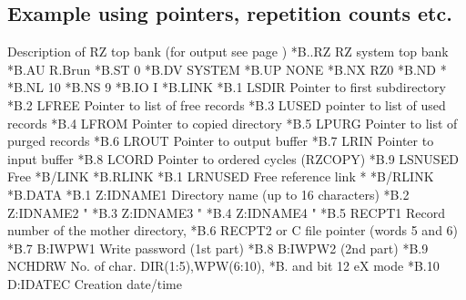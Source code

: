 \subsection{Example using pointers, repetition counts etc.}
\begin{XMPt}{Description of RZ top bank (for output see page \pageref{xmp:rztop})}
*B..RZ  RZ system top bank
*B.AU   R.Brun
*B.ST   0
*B.DV   SYSTEM
*B.UP   NONE
*B.NX   RZ0
*B.ND   *
*B.NL   10
*B.NS   9
*B.IO   I
*B.LINK
*B.1    LSDIR      Pointer to first subdirectory
*B.2    LFREE      Pointer to list of free records
*B.3    LUSED      pointer to list of used records
*B.4    LFROM      Pointer to copied directory
*B.5    LPURG      Pointer to list of purged records
*B.6    LROUT      Pointer to output buffer
*B.7    LRIN       Pointer to input buffer
*B.8    LCORD      Pointer to ordered cycles (RZCOPY)
*B.9    LSNUSED    Free 
*B/LINK
*B.RLINK
*B.1    LRNUSED    Free reference link                     *
*B/RLINK
*B.DATA
*B.1     Z:IDNAME1     Directory name  (up to 16 characters)    
*B.2     Z:IDNAME2                 "                              
*B.3     Z:IDNAME3                 "                              
*B.4     Z:IDNAME4                 "                              
*B.5     RECPT1        Record number of the mother directory,   
*B.6     RECPT2        or C file pointer (words 5 and 6)        
*B.7     B:IWPW1       Write password (1st part)                
*B.8     B:IWPW2                      (2nd part)                
*B.9     NCHDRW        No. of char. DIR(1:5),WPW(6:10), 
*B.                    and  bit 12 eX mode   
*B.10    D:IDATEC      Creation date/time                       
\end{XMPt}
